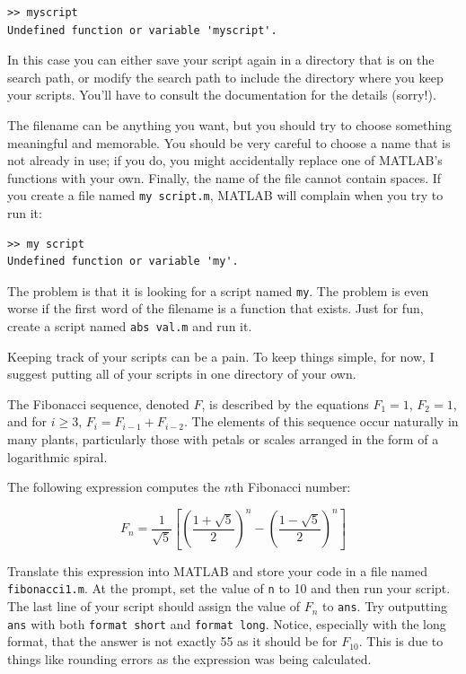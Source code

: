 \documentclass{book}
\begin{document}
\begin{verbatim}
>> myscript
Undefined function or variable 'myscript'.
\end{verbatim}

In this case you can either save your script again in a directory
that is on the search path, or modify the search path to include
the directory where you keep your scripts.  You'll have to consult
the documentation for the details (sorry!).

The filename can be anything you want, but you should try to choose
something meaningful and memorable.  You should be very careful to choose a
name that is not already in use; if you do, you might accidentally
replace one of MATLAB's functions with your own.
Finally, the name of the file cannot contain spaces.  If you create
a file named {\tt my script.m}, MATLAB will complain when you try
to run it:

\begin{verbatim}
>> my script
Undefined function or variable 'my'.
\end{verbatim}

The problem is that it is looking for a script named {\tt my}.  The
problem is even worse if the first word of the filename is a function
that exists.  Just for fun, create a script named {\tt abs val.m}
and run it.

Keeping track of your scripts can be a pain.  To keep things simple,
for now, I suggest putting all of your scripts in one
directory of your own.

\begin{ex}
The Fibonacci sequence, denoted $F$, is described by the equations
$F_1 = 1$, $F_2 = 1$, and for $i \ge 3$, $F_{i} = F_{i-1} + F_{i-2}$.
The elements of this sequence occur naturally in many plants,
particularly those with petals or scales arranged in the form of a
logarithmic spiral.

The following expression computes the
$n$th Fibonacci number:

\begin{equation}
F_n = \frac{1}{\sqrt{5}}
\left[
\left( \frac{1 + \sqrt{5}}{2} \right)^{n} -
\left( \frac{1 - \sqrt{5}}{2} \right)^{n}
\right]
\end{equation}

Translate this expression into MATLAB and store your
code in a file named {\tt fibonacci1.m}.  At the prompt, set the value
of {\tt n} to 10 and then run your script.  The last line of your
script should assign the value of $F_n$ to {\tt ans}.
Try outputting {\tt ans} with both {\tt format short} and {\tt format long}.
Notice, especially with the long format, that the answer is not exactly
55 as it should be for $F_{10}$.  This is due to things like rounding errors
as the expression was being calculated.
\end{ex}
\end{document}
